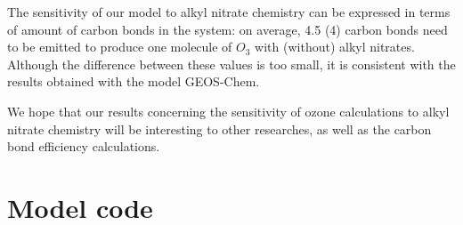 \documentclass[11pt,a4paper]{article}
\begin{document}
The sensitivity of our model to alkyl nitrate chemistry can be expressed in terms of amount of carbon bonds in the system: on average, 4.5 (4) carbon bonds need to be emitted to produce one molecule of $O_3$ with (without) alkyl nitrates. Although the difference between these values is too small, it is consistent with the results obtained with the model GEOS-Chem.

We hope that our results concerning the sensitivity of ozone calculations to alkyl nitrate chemistry will be interesting to other researches, as well as the carbon bond efficiency calculations.


\newpage
\appendix
\section{Model code} \label{sec:appendix1}


\end{document}
